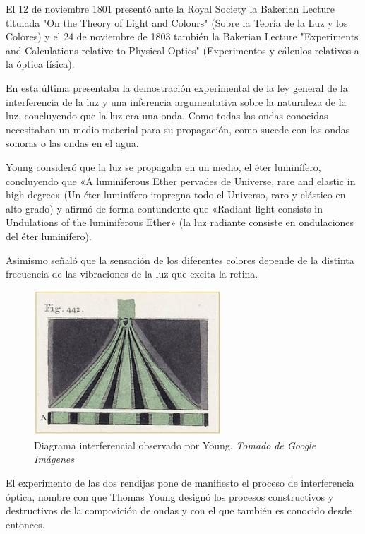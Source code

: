 \documentclass[journal]{IEEEtran}
\begin{document}
El 12 de noviembre 1801 presentó ante la Royal Society la Bakerian Lecture titulada "On the Theory of Light and Colours" (Sobre la Teoría de la Luz y los Colores) y el 24 de noviembre de 1803 también la Bakerian Lecture "Experiments and Calculations relative to Physical Optics" (Experimentos y cálculos relativos a la óptica física).

En esta última presentaba la demostración experimental de la ley general de la interferencia de la luz y una inferencia argumentativa sobre la naturaleza de la luz, concluyendo que la luz era una onda. Como todas las ondas conocidas necesitaban un medio material para su propagación, como sucede con las ondas sonoras o las ondas en el agua.

Young consideró que la luz se propagaba en un medio, el éter luminífero, concluyendo que «A luminiferous Ether pervades de Universe, rare and elastic in high degree» (Un éter luminífero impregna todo el Universo, raro y elástico en alto grado) y afirmó de forma contundente que «Radiant light consists in Undulations of the luminiferous Ether» (la luz radiante consiste en ondulaciones del éter luminífero). 

Asimismo señaló que la sensación de los diferentes colores depende de la distinta frecuencia de las vibraciones de la luz que excita la retina.

\begin{center}
  \begin{figure}[h!]
  \includegraphics[width=70mm]{diagrama_interferencial.jpg}
  \caption{Diagrama interferencial observado por Young. \emph{Tomado de Google Imágenes}}
  \end{figure}
\end{center}

El experimento de las dos rendijas pone de manifiesto el proceso de interferencia óptica, nombre con que Thomas Young designó los procesos constructivos y destructivos de la composición de ondas y con el que también es conocido desde entonces.
\end{document}
